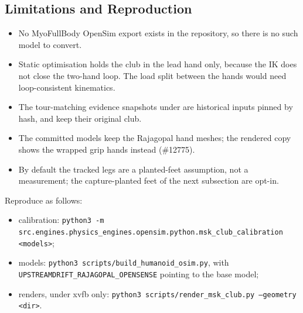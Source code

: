 \documentclass[11pt,a4paper]{article}
\begin{document}
\subsection{Limitations and Reproduction}
\begin{itemize}
\item No MyoFullBody OpenSim export exists in the repository, so there is no
  such model to convert.
\item Static optimisation holds the club in the lead hand only, because the
  IK does not close the two-hand loop. The load split between the hands
  would need loop-consistent kinematics.
\item The tour-matching evidence snapshots under
   are historical
  inputs pinned by hash, and keep their original club.
\item The committed models keep the Rajagopal hand meshes; the rendered copy
  shows the wrapped grip hands instead (\#12775).
\item By default the tracked legs are a planted-feet assumption, not a
  measurement; the capture-planted feet of the next subsection are opt-in.
\end{itemize}
Reproduce as follows:
\begin{itemize}
\item calibration:
  \texttt{python3 -m src.engines.physics\_engines.opensim.python.msk\_club\_calibration <models>};
\item models: \texttt{python3 scripts/build\_humanoid\_osim.py}, with
  \texttt{UPSTREAMDRIFT\_RAJAGOPAL\_OPENSENSE} pointing to the base model;
\item renders, under xvfb only:
  \texttt{python3 scripts/render\_msk\_club.py --geometry <dir>}.
\end{itemize}
\end{document}
